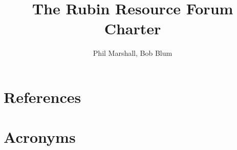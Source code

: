 \documentclass[OPS,authoryear,toc]{lsstdoc}
\title{The Rubin Resource Forum Charter}
\author{%
Phil Marshall, Bob Blum
}
\date{\vcsDate}
\begin{document}
\maketitle




\appendix
\section{References} \label{sec:bib}
\renewcommand{\refname}{} %


\section{Acronyms} \label{sec:acronyms}

\end{document}
